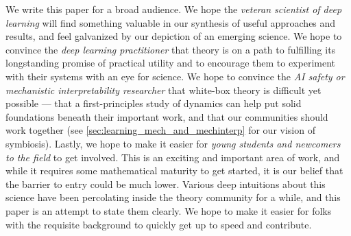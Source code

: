 We write this paper for a broad audience.
We hope the \textit{veteran scientist of deep learning} will find something valuable in our synthesis of useful approaches and results, and feel galvanized by our depiction of an emerging science.
We hope to convince the \textit{deep learning practitioner} that theory is on a path to fulfilling its longstanding promise of practical utility and to encourage them to experiment with their systems with an eye for science.
We hope to convince the \textit{AI safety or mechanistic interpretability researcher} that white-box theory is difficult yet possible --- that a first-principles study of dynamics can help put solid foundations beneath their important work, and that our communities should work together (see \cref{sec:learning_mech_and_mechinterp} for our vision of symbiosis).
Lastly, we hope to make it easier for \textit{young students and newcomers to the field} to get involved.
This is an exciting and important area of work, and while it requires some mathematical maturity to get started, it is our belief that the barrier to entry could be much lower.
Various deep intuitions about this science have been percolating inside the theory community for a while, and this paper is an attempt to state them clearly.
We hope to make it easier for folks with the requisite background to quickly get up to speed and contribute.
